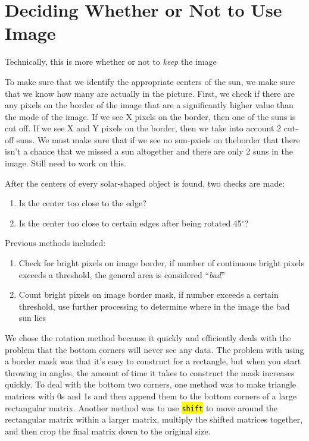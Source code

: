 \documentclass[10pt]{scrartcl}
\begin{document}
\section{Deciding Whether or Not to Use Image} %
\label{sec:deciding_whether_or_not_to_use_image}

Technically, this is more whether or not to \emph{keep} the image


To make sure that we identify the appropriate centers of the sun, we make sure that we know how many are actually in the picture. First, we check if there are any pixels on the border of the image that are a significantly higher value than the mode of the image. If we see X pixels on the border, then one of the suns is cut off. If we see X and Y pixels on the border, then we take into account 2 cut-off suns. We must make sure that if we see no sun-pxiels on theborder that there isn't a chance that we missed a sun altogether and there are only 2 suns in the image. Still need to work on this.

After the centers of every solar-shaped object is found, two checks are made:

\begin{enumerate}
    \item Is the center too close to the edge?
    \item Is the center too close to certain edges after being rotated 45$^\circ$?
\end{enumerate}

Previous methods included:

\begin{enumerate}
    \item Check for bright pixels on image border, if number of continuous bright pixels exceeds a threshold, the general area is considered ``\emph{bad}''
    \item Count bright pixels on image border mask, if number exceeds a certain threshold, use further processing to determine where in the image the bad sun lies
\end{enumerate}

We chose the rotation method because it quickly and efficiently deals with the problem that the bottom corners will never see any data. The problem with using a border mask was that it's easy to construct for a rectangle, but when you start throwing in angles, the amount of time it takes to construct the mask increases quickly. To deal with the bottom two corners, one method was to make triangle matrices with 0s and 1s and then append them to the bottom corners of a large rectangular matrix. Another method was to use \hl{\texttt{shift}} to move around the rectangular matrix within a larger matrix, multiply the shifted matrices together, and then crop the final matrix down to the original size. 
\end{document}
